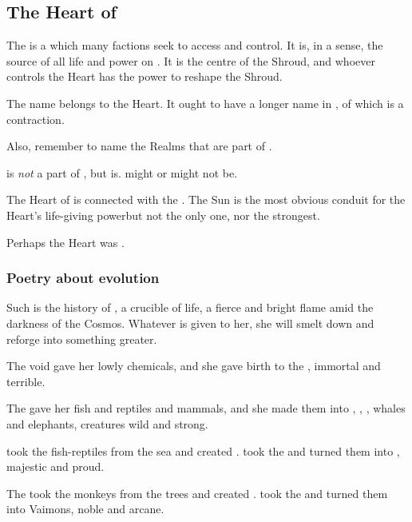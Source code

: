 \subsection{The Heart of \Miith}
The  is a \dweomer{} which many factions seek to access and control. 
It is, in a sense, the source of all life and power on \Miith{}. 
It is the centre of the Shroud, and whoever controls the Heart has the power to reshape the Shroud. 

The name \quo{\Miith} belongs to the Heart. 
It ought to have a longer name in \draconic, of which \quo{\Miith} is a contraction. 

Also, remember to name the Realms that are part of \Miith{}. 

\Erebos{} is \emph{not} a part of \Miith{}, but \Nyx{} is. 
 might or might not be. 

The Heart of \Miith{} is connected with the . The Sun is the most obvious conduit for the Heart's life-giving power\dash but not the only one, nor the strongest. 

Perhaps the Heart was . 









\subsubsection{Poetry about evolution}
Such is the history of \Miith{}, a crucible of life, a fierce and bright flame amid the darkness of the Cosmos. Whatever is given to her, she will smelt down and reforge into something greater. 

The void gave her lowly chemicals, and she gave birth to the \krakens{}, immortal and terrible. 

The \voyagers{} gave her fish and reptiles and mammals, and she made them into \caderyns, \nycans{}, \cortios{}, whales and elephants, creatures wild and strong. 

\Moroch{} took the fish-reptiles from the sea and created \nagae{}. \Miith{} took the \nagae{} and turned them into \dragons{}, majestic and proud. 

The \banes{} took the monkeys from the trees and created \humans{}. \Miith{} took the \humans{} and turned them into Vaimons, noble and arcane. 

